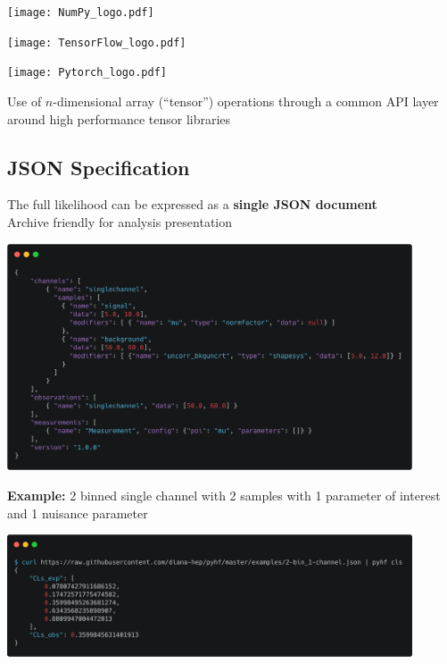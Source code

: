 \documentclass[a0paper,fleqn]{betterposter}
\newcommand{\fontsizeinstitution}{\fontsize{20}{25} \selectfont}
\begin{document}
{ %
 \vspace{0.5em}
 \begin{minipage}{0.33\textwidth}
  \begin{center}
   \texttt{[image: NumPy\_logo.pdf]}
  \end{center}
 \end{minipage}%
 \quad
 \begin{minipage}{0.33\textwidth}
  \begin{center}
   \texttt{[image: TensorFlow\_logo.pdf]}
  \end{center}
 \end{minipage}%
 \quad
 \begin{minipage}{0.33\textwidth}
  \begin{center}
   \texttt{[image: Pytorch\_logo.pdf]}
  \end{center}
 \end{minipage}%
 \vspace{0.5em}

 Use of $n$-dimensional array (``tensor'') operations through a common API layer around high performance tensor libraries

 \vspace{-1em}
 \subsection{JSON Specification}
 The full likelihood can be expressed as a \textbf{single JSON document}\\
 Archive friendly for analysis presentation
 \vspace{0.5em}
 \begin{center}
  \includegraphics[width=0.9\textwidth]{carbon_JSON_spec.png}
 \end{center}
 \vspace{-1em}
 \begin{center}
  {\fontsizeinstitution\textbf{Example:} 2 binned single channel with 2 samples with 1 parameter of interest and 1 nuisance parameter}
 \end{center}
 \begin{center}
  \includegraphics[width=0.9\textwidth]{carbon_pyhf_CLs.png}
 \end{center}

}
\end{document}
